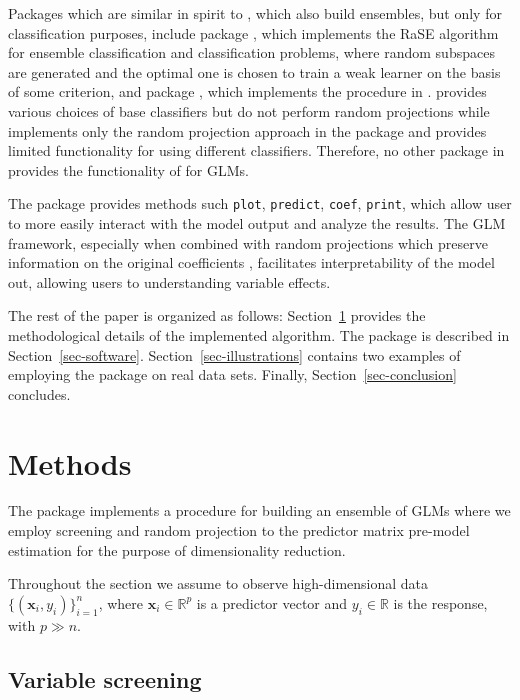 \documentclass[
  article]{jss}
\begin{document}
Packages which are similar in spirit to , which also build
ensembles, but only for classification purposes, include package
 \citep{pkg:RaSEn}, which implements the RaSE algorithm for
ensemble classification and classification problems, where random
subspaces are generated and the optimal one is chosen to train a weak
learner on the basis of some criterion, and package 
\citep{RPEnsembleR}, which implements the procedure in
\citet{cannings2017random}.  provides various choices of base
classifiers but do not perform random projections while 
implements only the random projection approach in the package and
provides limited functionality for using different classifiers.
Therefore, no other package in  provides the functionality
of  for GLMs.

The package provides methods such \texttt{plot}, \texttt{predict},
\texttt{coef}, \texttt{print}, which allow user to more easily interact
with the model output and analyze the results. The GLM framework,
especially when combined with random projections which preserve
information on the original coefficients \citep[such as the one
in][]{parzer2024glms}, facilitates interpretability of the model out,
allowing users to understanding variable effects.

The rest of the paper is organized as follows: Section~\ref{sec-models}
provides the methodological details of the implemented algorithm. The
package is described in Section~\ref{sec-software}.
Section~\ref{sec-illustrations} contains two examples of employing the
package on real data sets. Finally, Section~\ref{sec-conclusion}
concludes.

\section{Methods}\label{sec-models}

The package implements a procedure for building an ensemble of GLMs
where we employ screening and random projection to the predictor matrix
pre-model estimation for the purpose of dimensionality reduction.

Throughout the section we assume to observe high-dimensional data
\(\{(\boldsymbol{x}_i,y_i)\}_{i=1}^n\), where
\(\boldsymbol{x}_i\in\mathbb{R}^p\) is a predictor vector and
\(y_i\in\mathbb{R}\) is the response, with \(p\gg n\).

\subsection{Variable screening}\label{variable-screening}
\end{document}
